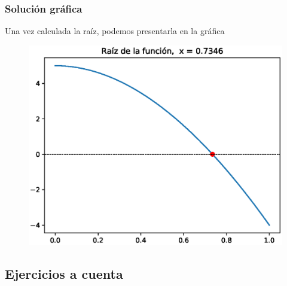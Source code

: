 \documentclass[12pt]{beamer}
\begin{document}
\begin{frame}[fragile]
\frametitle{Solución gráfica}
Una vez calculada la raíz, podemos presentarla en la gráfica
\begin{figure}
	\centering
	\includegraphics[scale=0.5]{Imagenes/Ejercicio_4_2_02_Libro.eps}
\end{figure}
\end{frame}

\subsection{Ejercicios a cuenta}
\end{document}
